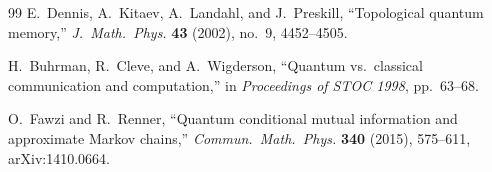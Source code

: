 \documentclass[11pt]{article}
\theoremstyle{remark}
\theoremstyle{plain}
\begin{document}
\begin{thebibliography}{99}
E.~Dennis, A.~Kitaev, A.~Landahl, and J.~Preskill,
``Topological quantum memory,''
\emph{J.\ Math.\ Phys.} \textbf{43} (2002), no.~9, 4452--4505.

H.~Buhrman, R.~Cleve, and A.~Wigderson,
``Quantum vs.\ classical communication and computation,''
in \emph{Proceedings of STOC 1998}, pp.~63--68.

O.~Fawzi and R.~Renner,
``Quantum conditional mutual information and approximate Markov chains,''
\emph{Commun.\ Math.\ Phys.} \textbf{340} (2015), 575--611,
arXiv:1410.0664.

\end{thebibliography}
\end{document}
